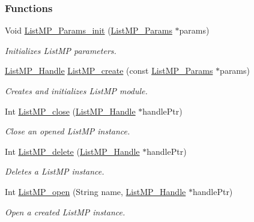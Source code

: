 \subsubsection*{Functions}
\begin{DoxyCompactItemize}
\item 
Void \hyperlink{_list_m_p_8h_a051127fdcd75440808d0fed31c6e8b4b}{List\-M\-P\-\_\-\-Params\-\_\-init} (\hyperlink{struct_list_m_p___params}{List\-M\-P\-\_\-\-Params} $\ast$params)
\begin{DoxyCompactList}\small\item\em Initializes List\-M\-P parameters. \end{DoxyCompactList}\item 
\hyperlink{_list_m_p_8h_abf5a0381ce9dab133382015abaf7fe6b}{List\-M\-P\-\_\-\-Handle} \hyperlink{_list_m_p_8h_a71fdd7f30d377065fb70dd095a186d3e}{List\-M\-P\-\_\-create} (const \hyperlink{struct_list_m_p___params}{List\-M\-P\-\_\-\-Params} $\ast$params)
\begin{DoxyCompactList}\small\item\em Creates and initializes List\-M\-P module. \end{DoxyCompactList}\item 
Int \hyperlink{_list_m_p_8h_a9f9045344d095a9829ba601d74d39c93}{List\-M\-P\-\_\-close} (\hyperlink{_list_m_p_8h_abf5a0381ce9dab133382015abaf7fe6b}{List\-M\-P\-\_\-\-Handle} $\ast$handle\-Ptr)
\begin{DoxyCompactList}\small\item\em Close an opened List\-M\-P instance. \end{DoxyCompactList}\item 
Int \hyperlink{_list_m_p_8h_a9a3875bf334cbc6d692e9053e7e4152b}{List\-M\-P\-\_\-delete} (\hyperlink{_list_m_p_8h_abf5a0381ce9dab133382015abaf7fe6b}{List\-M\-P\-\_\-\-Handle} $\ast$handle\-Ptr)
\begin{DoxyCompactList}\small\item\em Deletes a List\-M\-P instance. \end{DoxyCompactList}\item 
Int \hyperlink{_list_m_p_8h_aeae2eea832b0f2f8cf45ea297bb1c7d0}{List\-M\-P\-\_\-open} (String name, \hyperlink{_list_m_p_8h_abf5a0381ce9dab133382015abaf7fe6b}{List\-M\-P\-\_\-\-Handle} $\ast$handle\-Ptr)
\begin{DoxyCompactList}\small\item\em Open a created List\-M\-P instance. \end{DoxyCompactList}\item 

\end{DoxyCompactItemize}
